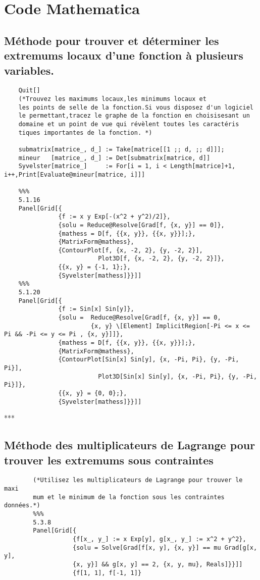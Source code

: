 \section{Code Mathematica}

\subsection{Méthode pour trouver et déterminer les extremums locaux d'une fonction à plusieurs variables.}

	\begin{verbatim}
	Quit[]
	(*Trouvez les maximums locaux,les minimums locaux et
	les points de selle de la fonction.Si vous disposez d'un logiciel
	le permettant,tracez le graphe de la fonction en choisisesant un 
	domaine et un point de vue qui révèlent toutes les caractéris­
	tiques importantes de la fonction. *)
	
	submatrix[matrice_, d_] := Take[matrice[[1 ;; d, ;; d]]];
	mineur   [matrice_, d_] := Det[submatrix[matrice, d]]	
	Syvelster[matrice_]     := For[i = 1, i < Length[matrice]+1, i++,Print[Evaluate@mineur[matrice, i]]]
	
	%%%
	5.1.16
	Panel[Grid[{
	           {f := x y Exp[-(x^2 + y^2)/2]},
	           {solu = Reduce@Resolve[Grad[f, {x, y}] == 0]},
	           {mathess = D[f, {{x, y}}, {{x, y}}];},
	           {MatrixForm@mathess},
	           {ContourPlot[f, {x, -2, 2}, {y, -2, 2}], 
	                      Plot3D[f, {x, -2, 2}, {y, -2, 2}]},
	           {{x, y} = {-1, 1};},
	           {Syvelster[mathess]}}]]
	%%%
	5.1.20
	Panel[Grid[{
	           {f := Sin[x] Sin[y]},
	           {solu =	Reduce@Resolve[Grad[f, {x, y}] == 0,
	           			{x, y} \[Element] ImplicitRegion[-Pi <= x <= Pi && -Pi <= y <= Pi , {x, y}]]},
	           {mathess = D[f, {{x, y}}, {{x, y}}];},
	           {MatrixForm@mathess},
	           {ContourPlot[Sin[x] Sin[y], {x, -Pi, Pi}, {y, -Pi, Pi}], 
	                      Plot3D[Sin[x] Sin[y], {x, -Pi, Pi}, {y, -Pi, Pi}]},
	           {{x, y} = {0, 0};},
	           {Syvelster[mathess]}}]]
	\end{verbatim}
	
	\begin{center}***\end{center}
	
	
\subsection{Méthode des multiplicateurs de Lagrange pour trouver les extremums sous contraintes}
		\begin{verbatim}
		(*Utilisez les multiplicateurs de Lagrange pour trouver le maxi­
		mum et le minimum de la fonction sous les contraintes données.*)
		%%%
		5.3.8
		Panel[Grid[{
		           {f[x_, y_] := x Exp[y], g[x_, y_] := x^2 + y^2},
		           {solu = Solve[Grad[f[x, y], {x, y}] == mu Grad[g[x, y], 
		           {x, y}] && g[x, y] == 2, {x, y, mu}, Reals]}}]]
		           {f[1, 1], f[-1, 1]}
	\end{verbatim}
	
